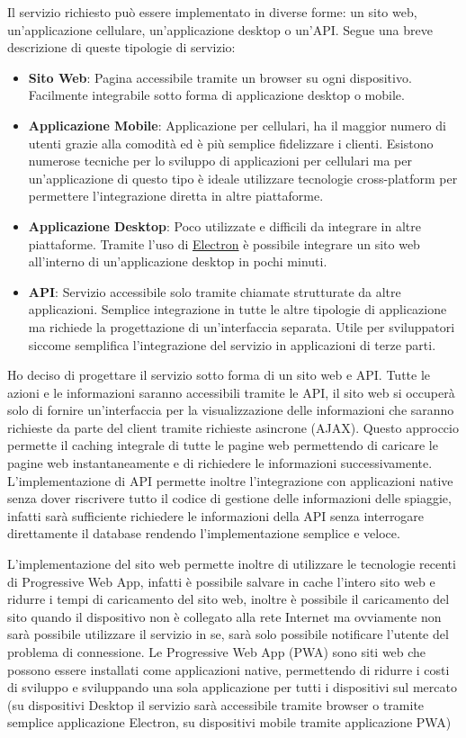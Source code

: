Il servizio richiesto pu\`o essere implementato in diverse forme: un sito web, un'applicazione cellulare, un'applicazione desktop o un'API\@. Segue una breve descrizione di queste tipologie di servizio:

\begin{itemize}
    \item \textbf{Sito Web}: Pagina accessibile tramite un browser su ogni dispositivo. Facilmente integrabile sotto forma di applicazione desktop o mobile.
    \item \textbf{Applicazione Mobile}: Applicazione per cellulari, ha il maggior numero di utenti grazie alla comodit\`a ed \`e pi\`u semplice fidelizzare i clienti. Esistono numerose tecniche per lo sviluppo di applicazioni per cellulari ma per un'applicazione di questo tipo \`e ideale utilizzare tecnologie cross-platform per permettere l'integrazione diretta in altre piattaforme.
    \item \textbf{Applicazione Desktop}: Poco utilizzate e difficili da integrare in altre piattaforme. Tramite l'uso di \href{https://www.electronjs.org/}{Electron} \`e possibile integrare un sito web all'interno di un'applicazione desktop in pochi minuti.
    \item \textbf{API}: Servizio accessibile solo tramite chiamate strutturate da altre applicazioni. Semplice integrazione in tutte le altre tipologie di applicazione ma richiede la progettazione di un'interfaccia separata. Utile per sviluppatori siccome semplifica l'integrazione del servizio in applicazioni di terze parti.
\end{itemize}

Ho deciso di progettare il servizio sotto forma di un sito web e API\@. Tutte le azioni e le informazioni saranno accessibili tramite le API, il sito web si occuper\`a solo di fornire un'interfaccia per la visualizzazione delle informazioni che saranno richieste da parte del client tramite richieste asincrone (AJAX). Questo approccio permette il caching integrale di tutte le pagine web permettendo di caricare le pagine web instantaneamente e di richiedere le informazioni successivamente. L'implementazione di API permette inoltre l'integrazione con applicazioni native senza dover riscrivere tutto il codice di gestione delle informazioni delle spiaggie, infatti sar\`a sufficiente richiedere le informazioni della API senza interrogare direttamente il database rendendo l'implementazione semplice e veloce.

L'implementazione del sito web permette inoltre di utilizzare le tecnologie recenti di Progressive Web App, infatti \`e possibile salvare in cache l'intero sito web e ridurre i tempi di caricamento del sito web, inoltre \`e possibile il caricamento del sito quando il dispositivo non \`e collegato alla rete Internet ma ovviamente non sar\`a possibile utilizzare il servizio in se, sar\`a solo possibile notificare l'utente del problema di connessione. Le Progressive Web App (PWA) sono siti web che possono essere installati come applicazioni native, permettendo di ridurre i costi di sviluppo e sviluppando una sola applicazione per tutti i dispositivi sul mercato (su dispositivi Desktop il servizio sar\`a accessibile tramite browser o tramite semplice applicazione Electron, su dispositivi mobile tramite applicazione PWA)
